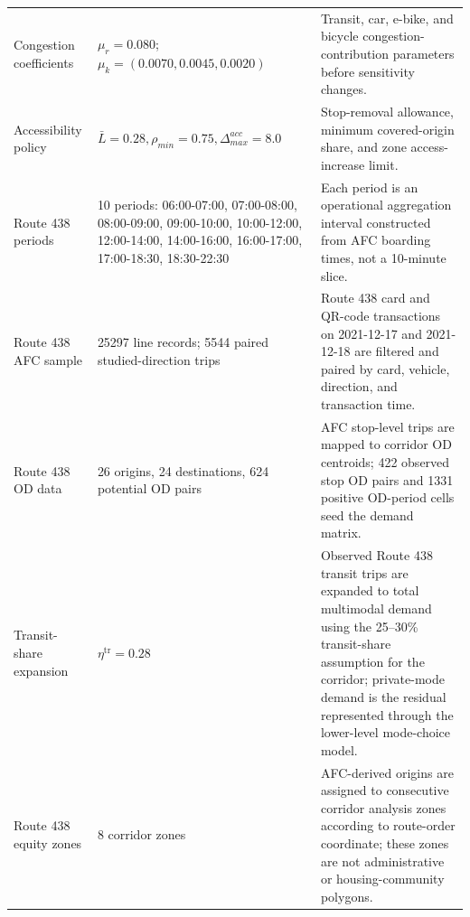 \begin{longtable}{p{}p{}p{}}
Congestion coefficients & \(\mu_r=0.080\); \(\mu_k=(0.0070, 0.0045, 0.0020)\) & Transit, car, e-bike, and bicycle congestion-contribution parameters before sensitivity changes. \\
Accessibility policy & \(\bar L=0.28,\rho_{min}=0.75,\Delta^{acc}_{max}=8.0\) & Stop-removal allowance, minimum covered-origin share, and zone access-increase limit. \\
Route 438 periods & 10 periods: 06:00-07:00, 07:00-08:00, 08:00-09:00, 09:00-10:00, 10:00-12:00, 12:00-14:00, 14:00-16:00, 16:00-17:00, 17:00-18:30, 18:30-22:30 & Each period is an operational aggregation interval constructed from AFC boarding times, not a 10-minute slice. \\
Route 438 AFC sample & 25297 line records; 5544 paired studied-direction trips & Route 438 card and QR-code transactions on 2021-12-17 and 2021-12-18 are filtered and paired by card, vehicle, direction, and transaction time. \\
Route 438 OD data & 26 origins, 24 destinations, 624 potential OD pairs & AFC stop-level trips are mapped to corridor OD centroids; 422 observed stop OD pairs and 1331 positive OD-period cells seed the demand matrix. \\
Transit-share expansion & \(\eta^{\mathrm{tr}}=0.28\) & Observed Route 438 transit trips are expanded to total multimodal demand using the 25--30\% transit-share assumption for the corridor; private-mode demand is the residual represented through the lower-level mode-choice model. \\
Route 438 equity zones & 8 corridor zones & AFC-derived origins are assigned to consecutive corridor analysis zones according to route-order coordinate; these zones are not administrative or housing-community polygons. \\
\end{longtable}
\normalsize
